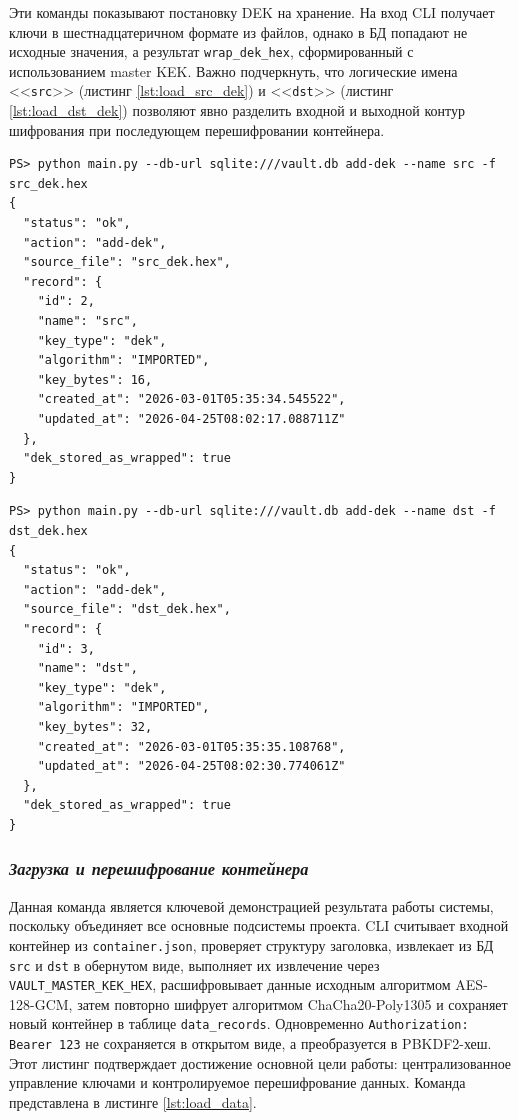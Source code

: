 \documentclass[14pt, a4paper]{extarticle}
\begin{document}
Эти команды показывают постановку DEK на хранение. На вход CLI получает ключи в шестнадцатеричном формате из файлов, однако в БД попадают не исходные значения, а результат \texttt{wrap\_dek\_hex}, сформированный с использованием master KEK. Важно подчеркнуть, что логические имена <<\texttt{src}>> (листинг \ref{lst:load_src_dek}) и <<\texttt{dst}>> (листинг \ref{lst:load_dst_dek}) позволяют явно разделить входной и выходной контур шифрования при последующем перешифровании контейнера.

\begin{lstlisting}[style=bashcommand, caption={Создание src DEK}, label=lst:load_src_dek]
PS> python main.py --db-url sqlite:///vault.db add-dek --name src -f src_dek.hex
{
  "status": "ok",
  "action": "add-dek",
  "source_file": "src_dek.hex",
  "record": {
    "id": 2,
    "name": "src",
    "key_type": "dek",
    "algorithm": "IMPORTED",
    "key_bytes": 16,
    "created_at": "2026-03-01T05:35:34.545522",
    "updated_at": "2026-04-25T08:02:17.088711Z"
  },
  "dek_stored_as_wrapped": true
}
\end{lstlisting}

\begin{lstlisting}[style=bashcommand, caption={Создание dst DEK}, label=lst:load_dst_dek]
PS> python main.py --db-url sqlite:///vault.db add-dek --name dst -f dst_dek.hex
{
  "status": "ok",
  "action": "add-dek",
  "source_file": "dst_dek.hex",
  "record": {
    "id": 3,
    "name": "dst",
    "key_type": "dek",
    "algorithm": "IMPORTED",
    "key_bytes": 32,
    "created_at": "2026-03-01T05:35:35.108768",
    "updated_at": "2026-04-25T08:02:30.774061Z"
  },
  "dek_stored_as_wrapped": true
}
\end{lstlisting}

\subsubsection*{\textit{Загрузка и перешифрование контейнера}}

Данная команда является ключевой демонстрацией результата работы системы, поскольку объединяет все основные подсистемы проекта. CLI считывает входной контейнер из \texttt{container.json}, проверяет структуру заголовка, извлекает из БД \texttt{src} и \texttt{dst} в обернутом виде, выполняет их извлечение через \texttt{VAULT\_MASTER\_KEK\_HEX}, расшифровывает данные исходным алгоритмом AES-128-GCM, затем повторно шифрует алгоритмом ChaCha20-Poly1305 и сохраняет новый контейнер в таблице \texttt{data\_records}. Одновременно \texttt{Authorization: Bearer 123} не сохраняется в открытом виде, а преобразуется в PBKDF2-хеш. Этот листинг подтверждает достижение основной цели работы: централизованное управление ключами и контролируемое перешифрование данных. Команда представлена в листинге \ref{lst:load_data}.
\end{document}
